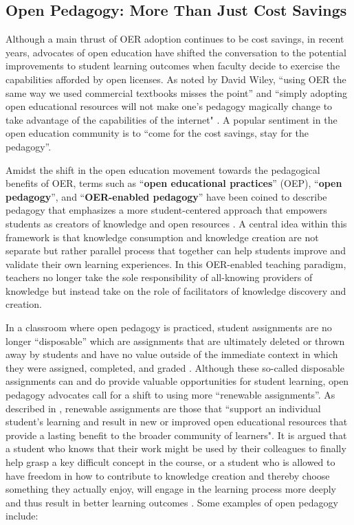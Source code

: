 \documentclass[11pt]{article}
\begin{document}
\subsection{Open Pedagogy: More Than Just Cost Savings}
Although a main thrust of OER adoption continues to be cost savings, in recent years, advocates of open education have shifted the conversation to the potential improvements to student learning outcomes when faculty decide to exercise the capabilities afforded by open licenses.  As noted by David Wiley, ``using OER the same way we used commercial textbooks misses the point'' and ``simply adopting open educational resources will not make one's pedagogy magically change to take advantage of the capabilities of the internet" \cite{DW:13}.  A popular sentiment in the open education community is to ``come for the cost savings, stay for the pedagogy''.

Amidst the shift in the open education movement towards the pedagogical benefits of OER, terms such as ``\textbf{open educational practices}'' (OEP), ``\textbf{open pedagogy}'', and ``\textbf{OER-enabled pedagogy}'' have been coined to describe pedagogy that emphasizes a more student-centered approach that empowers students as creators of knowledge and open resources \cite{EM:17, DW:13, DW-JH:18}.  A central idea within this framework is that knowledge consumption and knowledge creation are not separate but rather parallel process that together can help students improve and validate their own learning experiences.  In this OER-enabled teaching paradigm, teachers no longer take the sole responsibility of all-knowing providers of knowledge but instead take on the role of facilitators of knowledge discovery and creation.

In a classroom where open pedagogy is practiced, student assignments are no longer ``disposable'' which are assignments that are ultimately deleted or thrown away by students and have no value outside of the immediate context in which they were assigned, completed, and graded \cite{DW:13, DW-JH:18}. Although these so-called disposable assignments can and do provide valuable opportunities for student learning, open pedagogy advocates call for a shift to using more ``renewable assignments''. As described in \cite{DW:13, DW-JH:18}, renewable assignments are those that ``support an individual student's learning and result in new or improved open educational resources that provide a lasting benefit to the broader community of learners".  It is argued that a student who knows that their work might be used by their colleagues to finally help grasp a key difficult concept in the course, or a student who is allowed to have freedom in how to contribute to knowledge creation and thereby choose something they actually enjoy, will engage in the learning process more deeply and thus result in better learning outcomes \cite{DW:13, DW-JH:18}.  Some examples of open pedagogy include:
\end{document}
